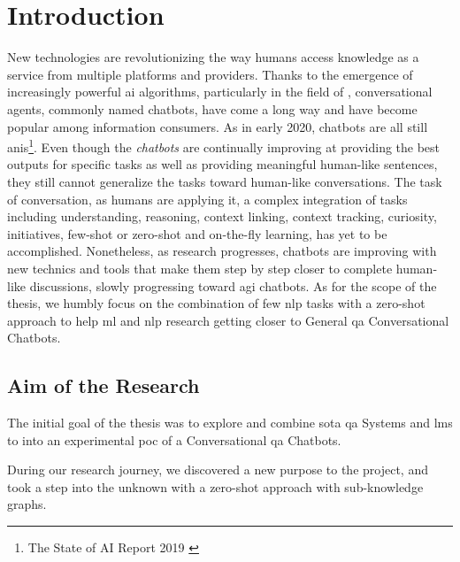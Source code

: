 \chapter{Introduction}
\label{chap:introduction}

New technologies are revolutionizing the way humans access knowledge as a service from multiple platforms and providers. Thanks to the emergence of increasingly powerful \gls{ai} algorithms, particularly in the field of , conversational agents, commonly named chatbots, have come a long way and have become popular among information consumers. As in early 2020, chatbots are all still \glspl{ani}\footnote{The State of AI Report 2019 \autocite{studies:state_of_ai_2019}}. Even though the \textit{chatbots} are continually improving at providing the best outputs for specific tasks as well as providing meaningful human-like sentences, they still cannot generalize the tasks toward human-like conversations. The task of conversation, as humans are applying it, a complex integration of tasks including understanding, reasoning, context linking, context tracking, curiosity, initiatives, \gls{few-shot} or \gls{zero-shot} and on-the-fly learning, has yet to be accomplished. Nonetheless, as research progresses, chatbots are improving with new technics and tools that make them step by step closer to complete human-like discussions, slowly progressing toward \gls{agi} chatbots. As for the scope of the thesis, we humbly focus on the combination of few \gls{nlp} tasks with a \gls{zero-shot} approach to help \gls{ml} and \gls{nlp} research getting closer to General \gls{qa} Conversational Chatbots. 

\section{Aim of the Research}
The initial goal of the thesis was to explore and combine \gls{sota} \gls{qa} Systems and \glspl{lm} to into an experimental \gls{poc} of a Conversational \gls{qa} Chatbots.

During our research journey, we discovered a new purpose to the project, and took a step into the unknown with a \gls{zero-shot} approach with sub-knowledge graphs.

